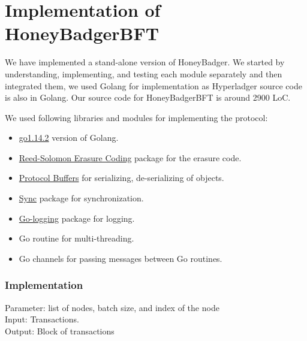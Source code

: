 \section{Implementation of HoneyBadgerBFT}
We have implemented a stand-alone version of HoneyBadger. We started by understanding, implementing, and testing each module separately and then integrated them, we used Golang for implementation as Hyperladger source code is also in Golang. Our source code for HoneyBadgerBFT is around 2900 LoC.

We used following libraries and modules for implementing the protocol:
\begin{itemize}
    \item \href{https://golang.org}{go1.14.2} version of Golang.
    \item \href{https://github.com/klauspost/reedsolomon}{Reed-Solomon Erasure Coding} package for the erasure code.
    
    \item \href{https://developers.google.com/protocol-buffers}{Protocol Buffers} for serializing, de-serializing of objects.
    \item \href{https://golang.org/pkg/sync/}{Sync} package for synchronization.
    \item \href{https://github.com/op/go-logging}{Go-logging} package for logging.
    \item Go routine for multi-threading.
    \item Go channels for passing messages between Go routines.
    
\end{itemize}

\subsubsection{Implementation}
Parameter: list of nodes, batch size, and index of the node\\
Input: Transactions.\\
Output: Block of transactions 
    
